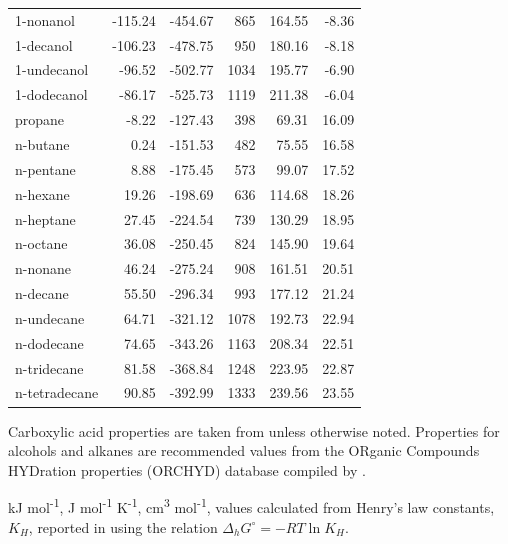\begin{table}
\begin{adjustbox}{height=\textheight,keepaspectratio}
\begin{threeparttable}
\begin{tabular}{lrrrrr}
1-nonanol & -115.24 & -454.67 & 865   & 164.55 & -8.36 \\
1-decanol & -106.23 & -478.75 & 950   & 180.16 & -8.18 \\
1-undecanol & -96.52 & -502.77 & 1034  & 195.77 & -6.90 \\
1-dodecanol & -86.17 & -525.73 & 1119  & 211.38 & -6.04 \\
propane & -8.22 & -127.43 & 398   & 69.31 & 16.09 \\
n-butane & 0.24  & -151.53 & 482   & 75.55 & 16.58 \\
n-pentane & 8.88  & -175.45 & 573   & 99.07 & 17.52 \\
n-hexane & 19.26 & -198.69 & 636   & 114.68 & 18.26 \\
n-heptane & 27.45 & -224.54 & 739   & 130.29 & 18.95 \\
n-octane & 36.08 & -250.45 & 824   & 145.90 & 19.64 \\
n-nonane & 46.24 & -275.24 & 908   & 161.51 & 20.51 \\
n-decane & 55.50 & -296.34 & 993   & 177.12 & 21.24 \\
n-undecane & 64.71 & -321.12 & 1078  & 192.73 & 22.94 \\
n-dodecane & 74.65 & -343.26 & 1163  & 208.34 & 22.51 \\
n-tridecane & 81.58 & -368.84 & 1248  & 223.95 & 22.87 \\
n-tetradecane & 90.85 & -392.99 & 1333  & 239.56 & 23.55 \\
\bottomrule
\end{tabular}%


  
  \begin{tablenotes}
    Carboxylic acid properties are taken from \cite{shock1995organic} unless otherwise noted. Properties for alcohols and alkanes are recommended values from the ORganic Compounds HYDration properties (ORCHYD) database compiled by \cite{plyasunova2004database}.
    
     kJ mol\textsuperscript{-1},
     J mol\textsuperscript{-1} K\textsuperscript{-1},
     cm\textsuperscript{3} mol\textsuperscript{-1},
     values calculated from Henry's law constants, $K_{H}$, reported in \cite{khan1992henry} using the relation $\Delta_{h}G^{\circ} = -RT\ln{K_{H}}$.
        
  \end{tablenotes}
  
  \label{tab:carbacid_alc_alk_props}
  \end{threeparttable}
  \end{adjustbox}
\end{table}
\setcounter{tabcounter}{0} %
\doublespace




